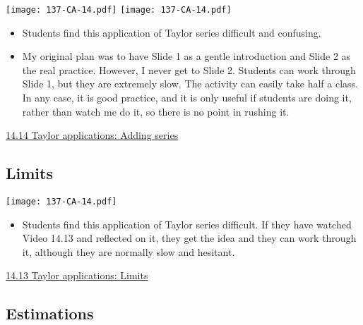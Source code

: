 \documentclass[11pt]{article}
\newcommand{\nl}{\hfill \vspace{-1.1\baselineskip}} %
\newcommand{\vxiii}{\hspace{8mm}  \href{https://www.youtube.com/watch?v=-CK3K_aeH64&list=PLlwePzQY_wW9h32ZwS6CYsY4eR_b2pE9j&index=13}{14.13 Taylor applications: Limits}}
\newcommand{\vxiv}{\hspace{8mm}  \href{https://www.youtube.com/watch?v=ajglGMrE5Gk&list=PLlwePzQY_wW9h32ZwS6CYsY4eR_b2pE9j&index=14}{14.14 Taylor applications: Adding series}}
\begin{document}
\begin{center}
{ \texttt{[image: 137-CA-14.pdf]}} \quad
{ \texttt{[image: 137-CA-14.pdf]}} 
\end{center}

\begin{comments}
\nl
	\begin{itemize}
		\item Students find this application of Taylor series difficult and confusing.
		
		\item My original plan was to have Slide 1 as a gentle introduction and Slide 2 as the real practice.  However, I never get to Slide 2.  Students can work through Slide 1, but they are extremely slow.  The activity can easily take half a class.    In any case, it is good practice, and it is only useful if students are doing it, rather than watch me do it, so there is no point in rushing it.
	\end{itemize}
\end{comments}

\begin{videos}
\vxiv
\end{videos}

\newpage
\subsection{Limits}

\begin{center}
{ \texttt{[image: 137-CA-14.pdf]}} 
\end{center}

\begin{comments}
\nl
	\begin{itemize}
		\item  Students find this application of Taylor series difficult.  If they have watched Video 14.13 and reflected on it, they get the idea and they can work through it, although they are normally slow and hesitant.
	\end{itemize}
\end{comments}

\begin{videos}
\vxiii
\end{videos}

\newpage
\subsection{Estimations}
\end{document}
